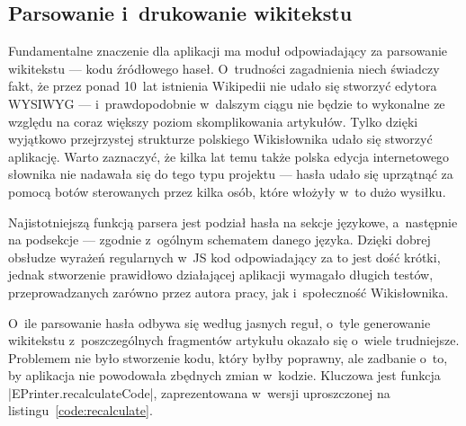 \subsection{Parsowanie i~drukowanie wikitekstu}
\label{impl:parser}
Fundamentalne znaczenie dla aplikacji ma moduł odpowiadający za parsowanie wikitekstu --- kodu źródłowego haseł. O~trudności zagadnienia niech świadczy fakt, że przez ponad 10~lat istnienia Wikipedii nie udało się stworzyć edytora WYSIWYG --- i~prawdopodobnie w~dalszym ciągu nie będzie to wykonalne ze względu na coraz większy poziom skomplikowania artykułów. Tylko dzięki wyjątkowo przejrzystej strukturze polskiego Wikisłownika udało się stworzyć aplikację. Warto zaznaczyć, że kilka lat temu także polska edycja internetowego słownika nie nadawała się do tego typu projektu --- hasła udało się uprzątnąć za pomocą botów sterowanych przez kilka osób, które włożyły w~to dużo wysiłku.

Najistotniejszą funkcją parsera jest podział hasła na sekcje językowe, a~następnie na podsekcje --- zgodnie z~ogólnym schematem danego języka. Dzięki dobrej obsłudze wyrażeń regularnych w~JS kod odpowiadający za to jest dość krótki, jednak stworzenie prawidłowo działającej aplikacji wymagało długich testów, przeprowadzanych zarówno przez autora pracy, jak i~społeczność Wikisłownika.

O~ile parsowanie hasła odbywa się według jasnych reguł, o~tyle generowanie wikitekstu z~poszczególnych fragmentów artykułu okazało się o~wiele trudniejsze. Problemem nie było stworzenie kodu, który byłby poprawny, ale zadbanie o~to, by aplikacja nie powodowała zbędnych zmian w~kodzie. Kluczowa jest funkcja \kod|EPrinter.recalculateCode|, zaprezentowana w~wersji uproszczonej na listingu~\ref{code:recalculate}.

